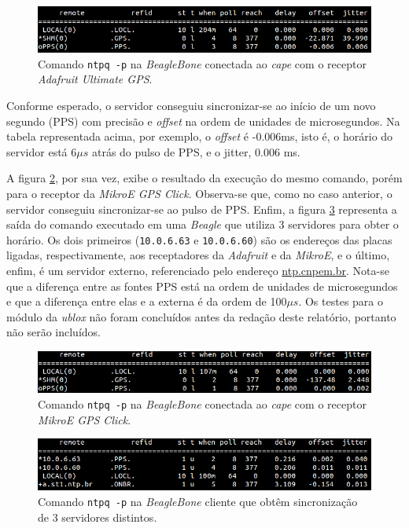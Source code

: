 \begin{figure}[h]
    
    \centering
    \includegraphics[scale=0.6]{image/adafruit_GPS}
    \caption {Comando \texttt{ntpq -p} na
    \textit{BeagleBone} conectada ao \textit{cape} com o receptor
    \textit{Adafruit Ultimate GPS}.}
    \label{img:adafruit} 
\end{figure} 

\vspace{12pt}

Conforme esperado, o servidor conseguiu sincronizar-se ao início de um novo
segundo (PPS) com precisão e \textit{offset} na ordem de unidades de
microsegundos. Na tabela representada acima, por exemplo, o \textit{offset} é
-0.006ms, isto é, o horário do servidor está 6\(\mu s\) atrás do pulso de
PPS, e o jitter, 0.006 ms.

\vspace{12pt}

A figura \ref{img:mikroe}, por sua vez, exibe o resultado da execução do mesmo
comando, porém para o receptor da \textit{MikroE GPS Click}. Observa-se que,
como no caso anterior, o servidor conseguiu sincronizar-se ao pulso de PPS.
Enfim, a figura \ref{img:cliente_ntp} representa a saída do comando executado em
uma \textit{Beagle} que utiliza 3 servidores para obter o horário. Os dois
primeiros (\texttt{10.0.6.63} e \texttt{10.0.6.60}) são os endereços das placas
ligadas, respectivamente, aos receptadores da \textit{Adafruit} e da
\textit{MikroE}, e o último, enfim, é um servidor externo, referenciado pelo
endereço \url{ntp.cnpem.br}.  Nota-se que a diferença entre as fontes PPS está
na ordem de unidades de microsegundos e que a diferença entre elas e a externa
é da ordem de 100\(\mu s\). Os testes para o módulo da \textit{ublox} não foram
concluídos antes da redação deste relatório, portanto não serão incluídos.

\begin{figure}[h]
    \centering
    \includegraphics[scale=0.6]{image/mikroe}
    \caption {Comando \texttt{ntpq -p} na
    \textit{BeagleBone} conectada ao \textit{cape} com o receptor \textit{MikroE
    GPS Click}.}  
    \label{img:mikroe} 
\end{figure} 

\begin{figure}[h!]
    
    \centering
    \includegraphics[scale=0.6]{image/cliente-ntp}
    \caption {Comando \texttt{ntpq -p} na \textit{BeagleBone} cliente que obtêm sincronização de 3 servidores distintos.}
    \label{img:cliente_ntp} 
\end{figure} 